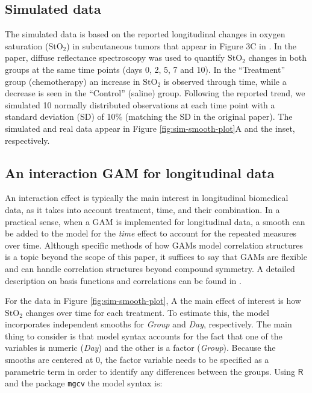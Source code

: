 \documentclass[Royal,times,doublespace,sagev]{sagej}
\newcommand{\passthrough}[1]{#1}
\begin{document}
\hypertarget{simulated-data}{%
\subsection{Simulated data}\label{simulated-data}}

The simulated data is based on the reported longitudinal changes in oxygen saturation (\(\mbox{StO}_2\)) in subcutaneous tumors that appear in Figure 3C in \cite{vishwanath2009}. In the paper, diffuse reflectance spectroscopy was used to quantify \(\mbox{StO}_2\) changes in both groups at the same time points (days 0, 2, 5, 7 and 10). In the ``Treatment'' group (chemotherapy) an increase in \(\mbox{StO}_2\) is observed through time, while a decrease is seen in the ``Control'' (saline) group. Following the reported trend, we simulated 10 normally distributed observations at each time point with a standard deviation (SD) of 10\% (matching the SD in the original paper).
The simulated and real data appear in Figure \ref{fig:sim-smooth-plot}A and the inset, respectively.

\hypertarget{an-interaction-gam-for-longitudinal-data}{%
\subsection{An interaction GAM for longitudinal data}\label{an-interaction-gam-for-longitudinal-data}}

An interaction effect is typically the main interest in longitudinal biomedical data, as it takes into account treatment, time, and their combination. In a practical sense, when a GAM is implemented for longitudinal data, a smooth can be added to the model for the \emph{time} effect to account for the repeated measures over time. Although specific methods of how GAMs model correlation structures is a topic beyond the scope of this paper, it suffices to say that GAMs are flexible and can handle correlation structures beyond compound symmetry. A detailed description on basis functions and correlations can be found in \cite{hefley2017}.

For the data in Figure \ref{fig:sim-smooth-plot}, A the main effect of interest is how \(\mbox{StO}_2\) changes over time for each treatment. To estimate this, the model incorporates independent smooths for \emph{Group} and \emph{Day}, respectively. The main thing to consider is that model syntax accounts for the fact that one of the variables is numeric (\emph{Day}) and the other is a factor (\emph{Group}). Because the smooths are centered at 0, the factor variable needs to be specified as a parametric term in order to identify any differences between the groups. Using \(\textsf{R}\) and the package \passthrough{\lstinline!mgcv!} the model syntax is:
\end{document}
